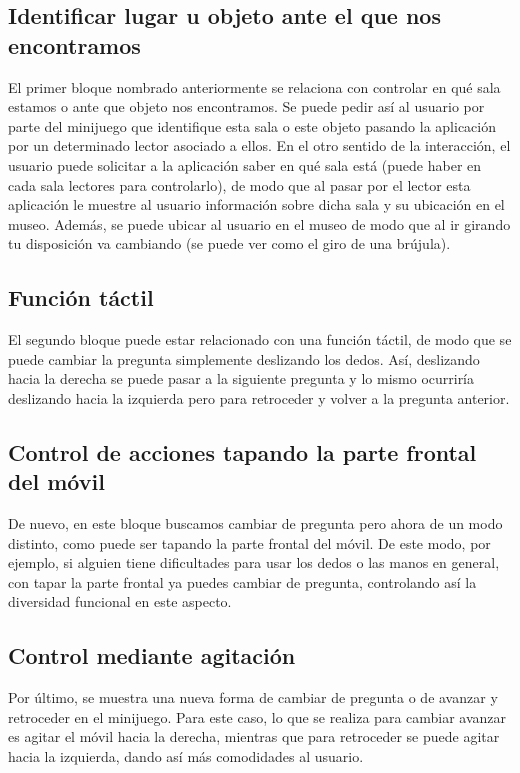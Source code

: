 \documentclass{article}
\begin{document}
\subsection*{Identificar lugar u objeto ante el que nos encontramos}

El primer bloque nombrado anteriormente se relaciona con controlar en qué sala estamos o ante que objeto nos encontramos. Se puede pedir así al usuario por parte del minijuego que identifique esta sala o este objeto pasando la aplicación por un determinado lector asociado a ellos. En el otro sentido de la interacción, el usuario puede solicitar a la aplicación saber en qué sala está (puede haber en cada sala lectores para controlarlo), de modo que al pasar por el  lector esta aplicación le muestre al usuario información sobre dicha sala y su ubicación en el museo. Además, se puede ubicar al usuario en el museo de modo que al ir girando tu disposición va cambiando (se puede ver como el giro de una brújula).

\subsection*{Función táctil}

El segundo bloque puede estar relacionado con una función táctil, de modo que se puede cambiar la pregunta simplemente deslizando los dedos. Así, deslizando hacia la derecha se puede pasar a la siguiente pregunta y lo mismo ocurriría deslizando hacia la izquierda pero para retroceder y volver a la pregunta anterior. 

\subsection*{Control de acciones tapando la parte frontal del móvil}

De nuevo, en este bloque buscamos cambiar de pregunta pero ahora de un modo distinto, como puede ser tapando la parte frontal del móvil. De este modo, por ejemplo, si alguien tiene dificultades para usar los dedos o las manos en general, con tapar la parte frontal ya puedes cambiar de pregunta, controlando así la diversidad funcional en este aspecto.

\subsection*{Control mediante agitación}

Por último, se muestra una nueva forma de cambiar de pregunta o de avanzar y retroceder en el minijuego. Para este caso, lo que se realiza para cambiar avanzar es agitar el móvil hacia la derecha, mientras que para retroceder se puede agitar hacia la izquierda, dando así más comodidades al usuario.
\end{document}
